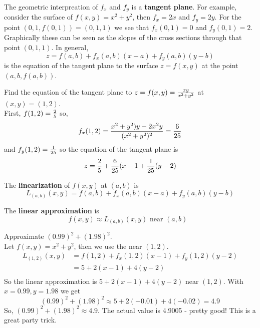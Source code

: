 \documentclass[english, 11pt]{article}
\begin{document}
  \begin{defn}\label{tangentplane}
    The geometric interpreation of $f_x$ and $f_y$ is a \textbf{tangent plane}. For example, consider the surface of $f(x,y) = x^2 + y^2$, then $f_x = 2x$ and $f_y = 2y$. For the point $(0,1,f(0,1)) = (0,1,1)$ we see that $f_x(0,1) = 0$ and $f_y(0,1) =2$. Graphically these can be seen as the slopes of the cross sections through that point $(0,1,1)$. In general,
    \[ z = f(a,b) + f_x(a,b)(x-a) + f_y(a,b)(y-b) \]
    is the equation of the tangent plane to the surface $z = f(x,y)$ at the point $(a,b,f(a,b))$.
  \end{defn}

  \begin{exmp}
    Find the equation of the tangent plane to $z = f(x,y) = \frac{xy}{x^2+y^2}$ at $(x,y) = (1,2)$. \\
    First, $f(1,2) = \frac{2}{5}$ so,
    \[ f_x(1,2) = \frac{x^2+y^2)y - 2x^2y}{(x^2 + y^2)^2} = \frac{6}{25} \]
    and $f_y(1,2) = \frac{1}{25}$ so the equation of the tangent plane is
    \[ z = \frac{2}{5} + \frac{6}{25}(x-1 + \frac{1}{25}(y-2) \]
  \end{exmp}

  \begin{defn}[linearization]\label{linearization}
    The \textbf{linearization} of $f(x,y)$ at $(a,b)$ is
    \[ L_{(a,b)}(x,y) = f(a,b) + f_x(a,b)(x-a) + f_y(a,b)(y-b) \]
  \end{defn}

  \begin{defn}\label{linear approximation}
    The \textbf{linear approximation} is
    \[ f(x,y) \approx L_{(a,b)}(x,y) \mbox{ \ near $(a,b)$ } \]
  \end{defn}

  \begin{exmp}
    Approximate $(0.99)^2 + (1.98)^2$. \\
    Let $f(x,y) = x^2 + y^2$, then we use the  near $(1,2)$.
    \begin{align*}
     L_{(1,2)}(x,y) & = f(1,2) + f_x(1,2)(x-1) + f_y(1,2)(y-2) \\
                    & = 5 + 2(x-1) + 4(y-2) \\
     \end{align*}
     So the linear approximation is $5 + 2(x-1) + 4(y-2)$ near $(1,2)$. With $x = 0.99, y = 1.98$ we get
     \[ (0.99)^2 + (1.98)^2 \approx 5 + 2(-0.01) + 4(-0.02) = 4.9 \]
     So, $(0.99)^2 + (1.98)^2 \approx 4.9$. The actual value is 4.9005 - pretty good! This is a great party trick.
  \end{exmp}
\end{document}
